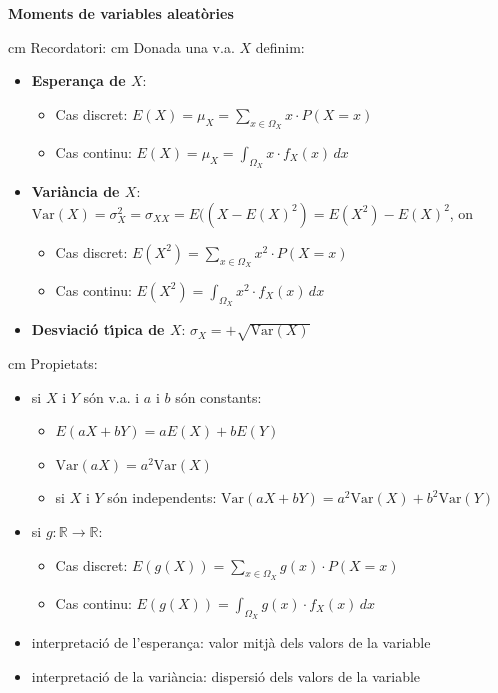 \documentclass{article}
\newcommand\R{\mathbb{R}}
\begin{document}
\noindent
\textbf{\large Moments de variables aleat\`ories}

 cm
\noindent
Recordatori:
 cm
Donada una v.a. $X$ definim:
\begin{itemize}
\item \textbf{Esperan\c{c}a de $X$}: 
\begin{itemize}
\item Cas discret: $E(X)=\mu_X=\displaystyle \sum_{x \in \Omega_X} x \cdot P(X=x)$
\item Cas continu: $E(X)=\mu_X=\displaystyle \int_{\Omega_X} x \cdot f_X(x) \, dx$ 
\end{itemize}
\item \textbf{Vari\`ancia de $X$}: $\mathrm{Var}(X)=\sigma_X^2=\sigma_{XX}=E((X-E(X)^2)=E(X^2)-E(X)^2$, on
\begin{itemize}
\item Cas discret: $E(X^2)=\displaystyle \sum_{x \in \Omega_X} x^2 \cdot P(X=x)$
\item Cas continu: $E(X^2)=\displaystyle \int_{\Omega_X} x^2 \cdot f_X(x) \, dx$ 
\end{itemize}
\item \textbf{Desviaci\'o t\'\i pica de $X$}: $\sigma_X=+\sqrt{\mathrm{Var}(X)}$
\end{itemize}

 cm
Propietats:
\begin{itemize}
\item si $X$ i $Y$ s\'on v.a. i $a$ i $b$ s\'on constants:
\begin{itemize}
\item $E(aX+bY)=aE(X)+bE(Y)$
\item $\mathrm{Var}(aX)=a^2 \mathrm{Var}(X)$
\item si $X$ i $Y$ s\'on independents: $\mathrm{Var}(aX+bY)=a^2 \mathrm{Var}(X)+b^2\mathrm{Var}(Y)$
\end{itemize}
\item si $g:\R \rightarrow \R$: 
\begin{itemize}
\item Cas discret: $E(g(X))=\displaystyle \sum_{x \in \Omega_X} g(x) \cdot P(X=x)$
\item Cas continu: $E(g(X))=\displaystyle \int_{\Omega_X} g(x) \cdot f_X(x) \, dx$ 
\end{itemize}
\item interpretaci\'o de l'esperan\c{c}a: valor mitj\`a dels valors de la variable
\item interpretaci\'o de la vari\`ancia: dispersi\'o dels valors de la variable
\end{itemize}
\end{document}
